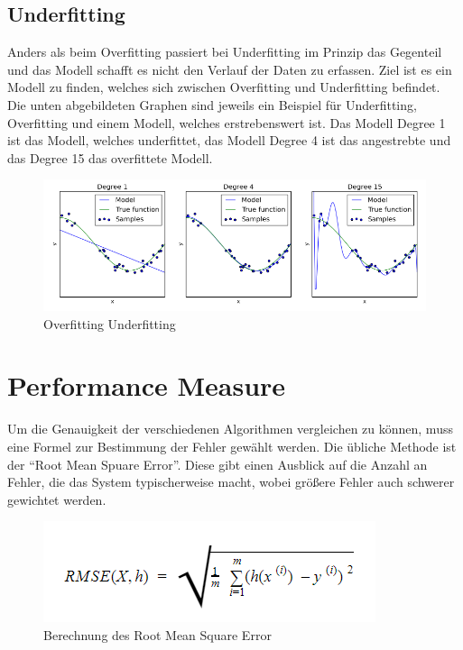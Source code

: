 \subsection{Underfitting}
\label{sec:underfitting}
Anders als beim Overfitting passiert bei Underfitting im Prinzip das Gegenteil und das Modell schafft es nicht den Verlauf der Daten zu erfassen\cite[S.~214.]{WML}.
Ziel ist es ein Modell zu finden, welches sich zwischen Overfitting und Underfitting befindet. Die unten abgebildeten Graphen sind jeweils ein Beispiel für Underfitting, Overfitting und einem Modell, welches erstrebenswert ist. Das Modell Degree 1 ist das Modell, welches underfittet, das Modell Degree 4 ist das angestrebte und das Degree 15 das overfittete Modell.
\newline
\begin{figure}
	\includegraphics[width=1.0\textwidth]{../Bilder/OverUnderfitting.PNG}
	\caption{Overfitting Underfitting}
\end{figure}


\section{Performance Measure}
\label{sec:performanceMeasure}
Um die Genauigkeit der verschiedenen Algorithmen vergleichen zu können, muss eine Formel zur Bestimmung der Fehler gewählt werden. 
Die übliche Methode ist der “Root Mean Spuare Error”. Diese gibt einen Ausblick auf die Anzahl an Fehler, die das System typischerweise macht, wobei größere Fehler auch schwerer gewichtet werden\cite[S.~39.]{AG}.
\newline
\begin{figure}
	\includegraphics[]{../Bilder/Berechnung.PNG}
	\caption{Berechnung des Root Mean Square Error}
\end{figure}


